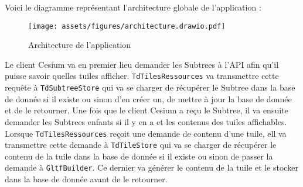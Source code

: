 Voici le diagramme représentant l'architecture globale de l'application :

\begin{figure}[H]
    \centering
    \texttt{[image: assets/figures/architecture.drawio.pdf]}
    \caption{Architecture de l'application}
    \label{fig:lods-colors}
\end{figure}

\newpage

Le client Cesium va en premier lieu demander les Subtrees à l'API afin qu'il puisse savoir quelles tuiles afficher. \texttt{TdTilesRessources} va transmettre cette requête à \texttt{TdSubtreeStore} qui va se charger de récupérer le Subtree dans la base de donnée si il existe ou sinon d'en créer un, de mettre à jour la base de donnée et de le retourner. Une fois que le client Cesium a reçu le Subtree, il va ensuite demander les Subtrees enfants si il y en a et les contenus des tuiles affichables. Lorsque \texttt{TdTilesRessources} reçoit une demande de contenu d'une tuile, ell va transmettre cette demande à \texttt{TdTileStore} qui va se charger de récupérer le contenu de la tuile dans la base de donnée si il existe ou sinon de passer la demande à \texttt{GltfBuilder}. Ce dernier va générer le contenu de la tuile et le stocker dans la base de donnée avant de le retourner.
